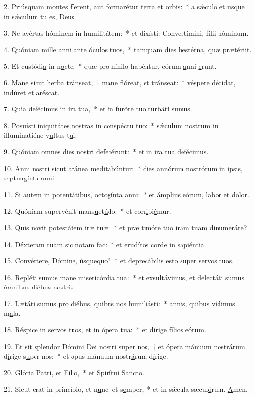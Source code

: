 2. Priúsquam montes fíerent, aut formarétur t\uline{e}rra et \uline{o}rbis:~* a sǽculo et usque in sǽculum t\uline{u} es, D\uline{e}us.\par 
3. Ne avértas hóminem in hum\uline{i}lit\uline{á}tem:~* et dixísti: Convertímini, f\uline{í}lii h\uline{ó}minum.\par 
4. Quóniam mille anni ante \uline{ó}culos t\uline{u}os,~* tamquam dies hestérna, \uline{quæ} præt\uline{é}riit.\par 
5. Et custódi\uline{a} in n\uline{o}cte,~* quæ pro níhilo habéntur, eórum \uline{a}nni \uline{e}runt.\par 
6. Mane sicut herba \uline{trán}seat,~† mane flóre\uline{a}t, et tr\uline{á}nseat:~* véspere décidat, indúret \uline{e}t ar\uline{é}scat.\par 
7. Quia defécimus in \uline{i}ra t\uline{u}a,~* et in furóre tuo turb\uline{á}ti s\uline{u}mus.\par 
8. Posuísti iniquitátes nostras in consp\uline{é}ctu t\uline{u}o:~* sǽculum nostrum in illuminatióne v\uline{u}ltus t\uline{u}i.\par 
9. Quóniam omnes dies nostri d\uline{e}fec\uline{é}runt:~* et in ira t\uline{u}a def\uline{é}cimus.\par 
10. Anni nostri sicut aránea med\uline{i}tab\uline{ú}ntur:~* dies annórum nostrórum in ipsis, septuag\uline{í}nta \uline{a}nni.\par 
11. Si autem in potentátibus, octog\uline{í}nta \uline{a}nni:~* et ámplius eórum, l\uline{a}bor et d\uline{o}lor.\par 
12. Quóniam supervénit mans\uline{u}et\uline{ú}do:~* et corr\uline{i}pi\uline{é}mur.\par 
13. Quis novit potestátem \uline{i}ræ t\uline{u}æ:~* et præ timóre tuo iram tuam din\uline{u}mer\uline{á}re?\par 
14. Déxteram t\uline{u}am sic n\uline{o}tam fac:~* et erudítos corde in s\uline{a}pi\uline{é}ntia.\par 
15. Convértere, D\uline{ó}mine, \uline{ú}squequo?~* et deprecábilis esto super s\uline{e}rvos t\uline{u}os.\par 
16. Repléti sumus mane miseric\uline{ó}rdia t\uline{u}a:~* et exsultávimus, et delectáti sumus ómnibus di\uline{é}bus n\uline{o}stris.\par 
17. Lætáti sumus pro diébus, quibus nos hum\uline{i}li\uline{á}sti:~* annis, quibus v\uline{í}dimus m\uline{a}la.\par 
18. Réspice in servos tuos, et in \uline{ó}pera t\uline{u}a:~* et dírige fíli\uline{o}s e\uline{ó}rum.\par 
19. Et sit splendor Dómini Dei nostri \uline{su}per nos,~† et ópera mánuum nostrárum d\uline{í}rige s\uline{u}per nos:~* et opus mánuum nostr\uline{á}rum d\uline{í}rige.\par 
20. Glória P\uline{a}tri, et F\uline{í}lio,~* et Spir\uline{í}tui S\uline{a}ncto.\par 
21. Sicut erat in princípio, et n\uline{u}nc, et s\uline{e}mper,~* et in sǽcula sæcul\uline{ó}rum. \uline{A}men.\par 
